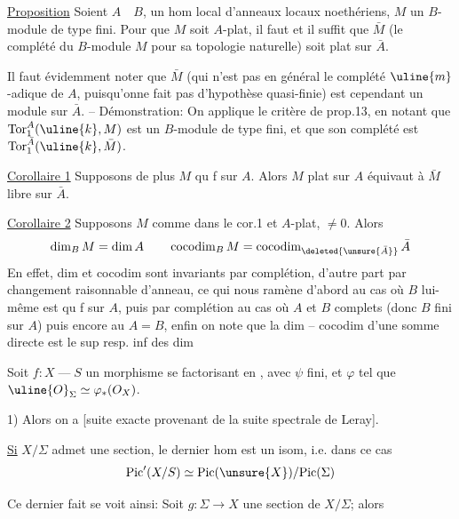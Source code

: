 \uline{Proposition} Soient $A\quad B$,  un hom local d'anneaux locaux noethériens, $M$ un $B$-module de type fini. Pour que $M$ soit $A$-plat, il faut et il suffit que $\bar M$ (le complété du $B$-module $M$ pour sa topologie naturelle) soit plat sur $\bar A$.

Il faut évidemment noter que $\bar M$ (qui n'est pas en général le complété $\uline{m}$-adique de $A$, puisqu'onne fait pas d'hypothèse quasi-finie) est cependant un module sur $\bar A$. -- Démonstration: On applique le critère de prop.13, en notant que $\operatorname{Tor}_1^A(\uline{k},M)$ est un $B$-module de type fini, et que son complété est $\operatorname{Tor}_1^{\bar A}(\uline{k},\bar M)$.

\uline{Corollaire 1} Supposons de plus $M$ qu f sur $A$. Alors $M$ plat sur $A$ équivaut à $\bar M$ libre sur $\bar A$.

\uline{Corollaire 2} Supposons $M$ comme dans le cor.1 et $A$-plat, $\ne0$. Alors
\[
\dim_B M=\dim A\qquad \operatorname{cocodim}_B M=\operatorname{cocodim}_{\deleted{\unsure{\bar A}}}\bar A
\]
En effet, dim et cocodim sont invariants par complétion, d'autre part par changement raisonnable d'anneau, ce qui nous ramène d'abord au cas où $B$ lui-même est qu f sur $A$, puis par complétion au cas où $A$ et $B$ complets (donc $B$ fini sur $A$) puis encore au $A=B$, enfin on note que la dim -- cocodim d'une somme directe est le sup resp. inf des dim 

Soit $f:X\mathbin{\text{---}}S$ un morphisme se factorisant en
, avec $\psi$ fini, et $\varphi$ tel que $\uline{O}_{\Sigma}\simeq\varphi_*(O_X)$.

1) Alors on a
[suite exacte provenant de la suite spectrale de Leray].

 \uline{Si} $X/\Sigma$ admet une section, le dernier hom est un isom, i.e. dans ce cas
\[
\mathrm{Pic}'(X/S)\simeq\mathrm{Pic}(\unsure{X})/\mathrm{Pic}(\Sigma)
\]

Ce dernier fait se voit ainsi:  Soit $g:\Sigma\longrightarrow X$ une section de $X/\Sigma$; alors

